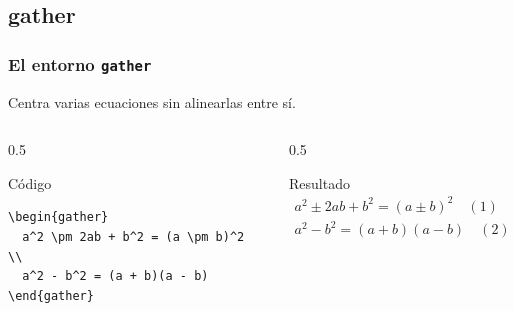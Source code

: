 \documentclass[12pt,aspectratio=169,ignorenonframetext]{ltxbeamer}
\begin{document}
\subsection{gather}
\begin{frame}[fragile]
\frametitle{El entorno \texttt{gather}}
Centra varias ecuaciones sin alinearlas entre sí.

\begin{columns}
\begin{column}{0.5\textwidth}
    \begin{block}{Código}
\begin{verbatim}
\begin{gather}
  a^2 \pm 2ab + b^2 = (a \pm b)^2  \\
  a^2 - b^2 = (a + b)(a - b)
\end{gather}
\end{verbatim}
        \end{block}
    \end{column}

    \begin{column}{0.5\textwidth}
        \begin{exampleblock}{Resultado}
            \begin{equation*}
                \begin{gathered}
                    a^2 \pm 2ab + b^2 = (a \pm b)^2 \quad (1) \\
                    a^2 - b^2 = (a + b)(a - b) \quad (2)
                \end{gathered}
            \end{equation*}
        \end{exampleblock}
    \end{column}
\end{columns}
\end{frame}
\end{document}
